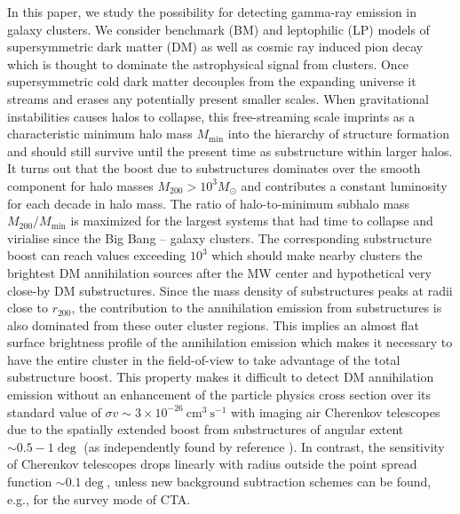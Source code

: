 \documentclass[10pt,aps,pra,reprint,amsmath,amsfonts,amssymb,showpacs,nofootinbib,floatfix]{revtex4-1}
\newcommand{\msun}{M_\odot}
\newcommand{\rvir}{r_{200}}
\newcommand{\mvir}{M_{200}}
\begin{document}
In this paper, we study the possibility for detecting gamma-ray
emission in galaxy clusters. We consider benchmark (BM) and
leptophilic (LP) models of supersymmetric dark matter (DM) as well as
cosmic ray induced pion decay which is thought to dominate the
astrophysical signal from clusters. Once supersymmetric cold dark
matter decouples from the expanding universe it streams and erases any
potentially present smaller scales. When gravitational instabilities
causes halos to collapse, this free-streaming scale imprints as a
characteristic minimum halo mass $M_\mathrm{min}$ into the hierarchy
of structure formation and should still survive until the present time
as substructure within larger halos. It turns out that the boost due
to substructures dominates over the smooth component for halo masses
$\mvir>10^3 \msun$ and contributes a constant luminosity for each
decade in halo mass. The ratio of halo-to-minimum subhalo mass
$\mvir/M_\mathrm{min}$ is maximized for the largest systems that had
time to collapse and virialise since the Big Bang -- galaxy
clusters. The corresponding substructure boost can reach values
exceeding $10^3$ which should make nearby clusters the brightest DM
annihilation sources after the MW center and hypothetical very
close-by DM substructures.  Since the mass density of substructures
peaks at radii close to $\rvir$, the contribution to the annihilation
emission from substructures is also dominated from these outer cluster
regions.  This implies an almost flat surface brightness profile of
the annihilation emission which makes it necessary to have the entire
cluster in the field-of-view to take advantage of the total
substructure boost. This property makes it difficult to detect DM
annihilation emission without an enhancement of the particle physics
cross section over its standard value of $\sigma v\sim 3\times
10^{-26} ~\mathrm{cm}^3~\mathrm{s}^{-1}$ with imaging air Cherenkov
telescopes due to the spatially extended boost from substructures of
angular extent $\sim 0.5-1\deg$ (as independently found by reference
\cite{2011arXiv1104.3530S}). In contrast, the sensitivity of Cherenkov
telescopes drops linearly with radius outside the point spread
function $\sim 0.1\deg$, unless new background subtraction schemes can
be found, e.g., for the survey mode of CTA.
\end{document}

